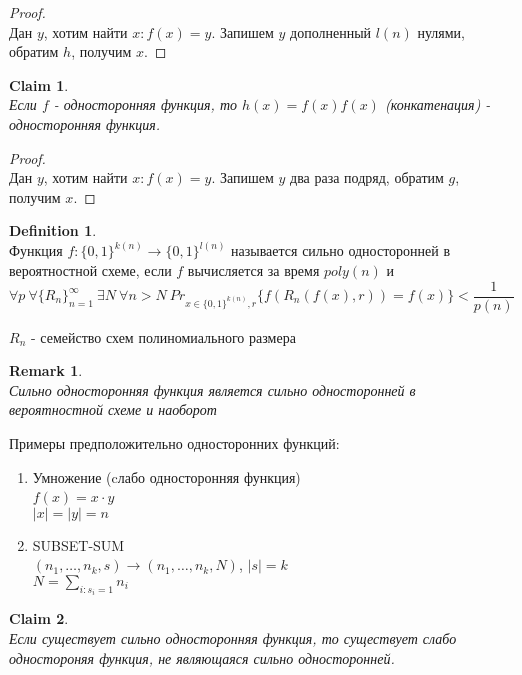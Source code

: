 \documentclass[a4paper]{article}
\theoremstyle{definition}
\newtheorem{definition}{Definition}
\theoremstyle{plain}
\newtheorem{remark}{Remark}
\newtheorem{claim}{Claim}
\begin{document}
\begin{proof}~\\
    Дан $y$, хотим найти $x\colon f(x) = y$. Запишем $y$ дополненный $l(n)$ нулями, обратим $h$, получим $x$.
\end{proof}

\begin{claim}~\\
    Если $f$ - односторонняя функция, то $h(x) = f(x)f(x)$ (конкатенация) - односторонняя функция.
\end{claim}

\begin{proof}~\\
    Дан $y$, хотим найти $x\colon f(x) = y$. Запишем $y$ два раза подряд, обратим $g$, получим $x$.
\end{proof}

\begin{definition}~\\
    Функция $f\colon \{0, 1\}^{k(n)} \rightarrow \{0, 1\}^{l(n)}$ называется сильно односторонней в вероятностной схеме, если $f$ вычисляется за время $poly(n)$ и
    $$
        \forall p\ \forall\{R_n\}_{n = 1}^{\infty}\ \exists N\ \forall n > N\ Pr_{x \in \{0, 1\}^{k(n)}, r}\{f(R_n(f(x), r)) = f(x)\} < \frac{1}{p(n)}
    $$
    
  \noindent $R_n$ - семейство схем полиномиального размера
\end{definition}

\begin{remark}~\\
    Сильно односторонняя функция является сильно односторонней в вероятностной схеме и наоборот
\end{remark}

Примеры предположительно односторонних функций:
\begin{enumerate}
    \item Умножение (cлабо односторонняя функция)~\\
    $f(x) = x \cdot y$~\\
    $|x| = |y| = n$
    \item SUBSET-SUM~\\
    $(n_1,\ldots,n_k, s) \rightarrow (n_1,\ldots,n_k, N)$, $|s| = k$~\\
    $N = \sum_{i\colon s_i = 1}n_i$
\end{enumerate}

\begin{claim}~\\
    Если существует сильно односторонняя функция, то существует слабо одностороняя функция, не являющаяся сильно односторонней.
\end{claim}
\end{document}
